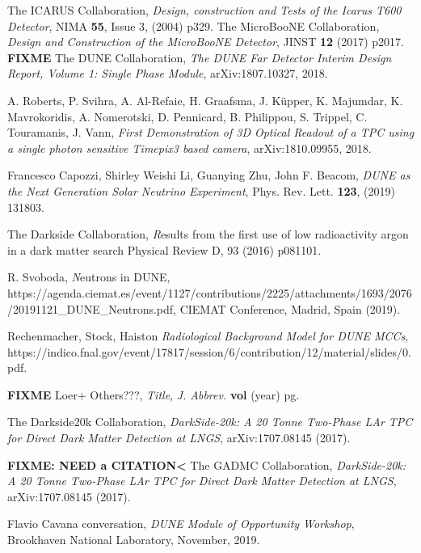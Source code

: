\documentclass[a4paper,11pt]{article}
\begin{document}
\begin{thebibliography}{99}

The ICARUS Collaboration, \emph{Design, construction and Tests of the Icarus T600 Detector}, NIMA {\bf 55}, Issue 3, (2004) p329.
The MicroBooNE Collaboration, \emph{Design and Construction of the MicroBooNE Detector}, JINST {\bf 12} (2017) p2017.
{\bf FIXME}
The DUNE Collaboration, \emph{The DUNE Far Detector Interim Design Report, Volume 1: Single Phase Module}, arXiv:1807.10327, 2018.

A. Roberts, P. Svihra, A. Al-Refaie, H. Graafsma, J. Küpper, K. Majumdar, K. Mavrokoridis, A. Nomerotski, D. Pennicard, B. Philippou, S. Trippel, C. Touramanis, J. Vann, \emph{First Demonstration of 3D Optical Readout of a TPC using a single photon sensitive Timepix3 based camera}, arXiv:1810.09955, 2018.

Francesco Capozzi, Shirley Weishi Li, Guanying Zhu, John F. Beacom, \emph{DUNE as the Next Generation Solar Neutrino Experiment}, Phys. Rev. Lett. {\bf 123}, (2019) 131803.

The Darkside Collaboration, {\emph Results from the first use of low radioactivity argon in a dark matter search} Physical Review D, 93 (2016) p081101.

R. Svoboda, {\emph Neutrons in DUNE},
https://agenda.ciemat.es/event/1127/contributions/2225/attachments/1693/2076/20191121\_DUNE\_Neutrons.pdf, CIEMAT Conference, Madrid, Spain (2019).

Rechenmacher, Stock, Haiston \emph{Radiological Background Model for DUNE MCCs},
https://indico.fnal.gov/event/17817/session/6/contribution/12/material/slides/0.pdf.

{\bf FIXME}
Loer+ Others???, \emph{Title}, \emph{J. Abbrev.} {\bf vol} (year) pg.

The Darkside20k Collaboration, \emph{DarkSide-20k: A 20 Tonne Two-Phase LAr TPC for Direct Dark Matter Detection at LNGS},
 arXiv:1707.08145 (2017).

{\bf FIXME: NEED a CITATION<}
The GADMC Collaboration,  \emph{DarkSide-20k: A 20 Tonne Two-Phase LAr TPC for Direct Dark Matter Detection at LNGS},
 arXiv:1707.08145 (2017).

Flavio Cavana conversation, \emph{DUNE Module of Opportunity Workshop}, Brookhaven National Laboratory, November, 2019.





\end{thebibliography}
\end{document}
